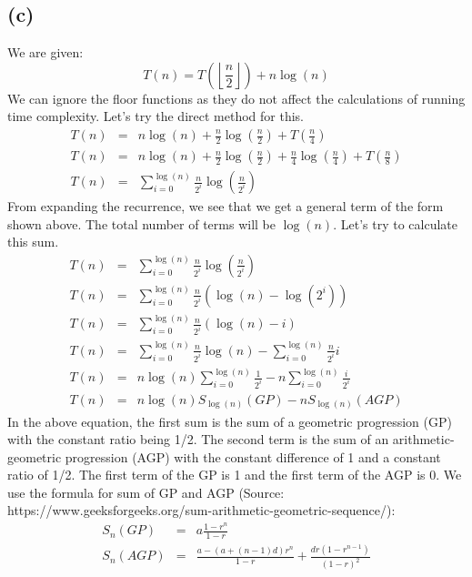 \documentclass[a4paper,12pt]{article} %
\begin{document}
\subsection*{(c)}
We are given:
\begin{equation*}
    T(n) = T\left(\left \lfloor \frac{n}{2} \right \rfloor \right) + n\log(n)
\end{equation*}
We can ignore the floor functions as they do not affect the calculations of running time complexity. Let's try the direct method for this.
\begin{eqnarray*}
    T(n) &=& n\log(n) + \frac{n}{2} \log\left(\frac{n}{2}\right) + T\left(\frac{n}{4}\right)\\
    T(n) &=& n\log(n) + \frac{n}{2} \log\left(\frac{n}{2}\right) + \frac{n}{4} \log\left(\frac{n}{4}\right) + T\left(\frac{n}{8}\right)\\
    T(n) &=& \sum_{i = 0}^{\log(n)}\frac{n}{2^i}\log\left(\frac{n}{2^i}\right)
\end{eqnarray*}
From expanding the recurrence, we see that we get a general term of the form shown above. The total number of terms will be $\log(n)$. Let's try to calculate this sum.
\begin{eqnarray}
    T(n) &=& \sum_{i = 0}^{\log(n)}\frac{n}{2^i}\log\left(\frac{n}{2^i}\right) \nonumber \\
    T(n) &=& \sum_{i = 0}^{\log(n)}\frac{n}{2^i}(\log(n) - \log(2^i))\nonumber \\
    T(n) &=& \sum_{i = 0}^{\log(n)}\frac{n}{2^i}(\log(n)-i)\nonumber \\
    T(n) &=& \sum_{i = 0}^{\log(n)}\frac{n}{2^i}\log(n)-\sum_{i = 0}^{\log(n)}\frac{n}{2^i}i\nonumber \\
    T(n) &=& n\log(n)\sum_{i = 0}^{\log(n)}\frac{1}{2^i}-n\sum_{i = 0}^{\log(n)}\frac{i}{2^i} \nonumber \\
    T(n) &=& n\log(n) S_{\log(n)}(GP) - nS_{\log(n)}(AGP)
\end{eqnarray}
In the above equation, the first sum is the sum of a  geometric progression (GP) with the constant ratio being 1/2. The second term is the sum of an arithmetic-geometric progression (AGP) with the constant difference of 1 and a constant ratio of 1/2. The first term of the GP is 1 and the first term of the AGP is 0. We use the formula for sum of GP and AGP (Source: https://www.geeksforgeeks.org/sum-arithmetic-geometric-sequence/):
\begin{eqnarray*}
    S_n(GP) &=& a\frac{1-r^n}{1-r}\\
    S_n(AGP) &=& \frac{a - (a + (n-1)d)r^n}{1-r} + \frac{dr(1 - r^{n-1})}{(1-r)^2}
\end{eqnarray*}
\end{document}
